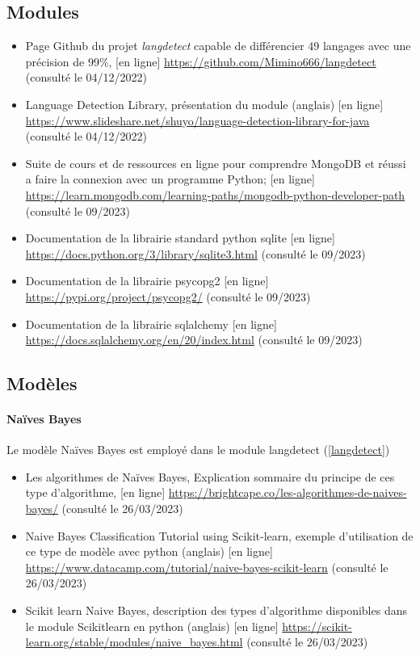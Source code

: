 \documentclass[a4paper,12pt]{article}
\begin{document}
		\subsection{Modules}
			\begin{itemize}
				\item Page Github du projet \emph{langdetect} capable de différencier 49 langages avec une précision de 99\%, [en ligne] \url{https://github.com/Mimino666/langdetect} (consulté le 04/12/2022) \label{langdetect}
				\item Language Detection Library, présentation du module (anglais) [en ligne] \url{https://www.slideshare.net/shuyo/language-detection-library-for-java} (consulté le 04/12/2022)
				\item Suite de cours et de ressources en ligne pour comprendre MongoDB et réussi a faire la connexion avec un programme Python; [en ligne] \url{https://learn.mongodb.com/learning-paths/mongodb-python-developer-path} (consulté le 09/2023)
				\item Documentation de la librairie standard python sqlite [en ligne] \url{https://docs.python.org/3/library/sqlite3.html} (consulté le 09/2023)
				\item Documentation de la librairie psycopg2 [en ligne] \url{https://pypi.org/project/psycopg2/} (consulté le 09/2023)
				\item Documentation de la librairie sqlalchemy [en ligne] \url{https://docs.sqlalchemy.org/en/20/index.html} (consulté le 09/2023)
			\end{itemize}
			
		\subsection{Modèles}
			\paragraph{Naïves Bayes}
				Le modèle Naïves Bayes est employé dans le module langdetect (\ref{langdetect})
				\begin{itemize}
					\item Les algorithmes de Naïves Bayes, Explication sommaire du principe de ces type d'algorithme, [en ligne] \url{https://brightcape.co/les-algorithmes-de-naives-bayes/} (consulté le 26/03/2023)
					\item Naive Bayes Classification Tutorial using Scikit-learn, exemple d'utilisation de ce type de modèle avec python (anglais) [en ligne] \url{https://www.datacamp.com/tutorial/naive-bayes-scikit-learn} (consulté le 26/03/2023)
					\item Scikit learn Naive Bayes, description des types d'algorithme disponibles dans le module Scikitlearn en python (anglais) [en ligne] \url{https://scikit-learn.org/stable/modules/naive_bayes.html} (consulté le 26/03/2023)
				\end{itemize}
\end{document}

